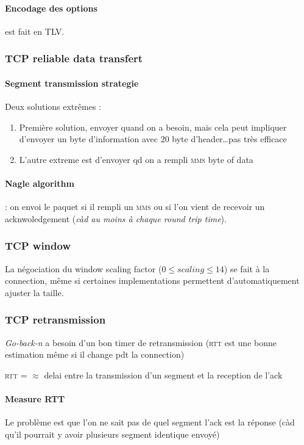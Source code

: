 \paragraph{Encodage des options} est fait en \textsc{TLV}.

\subsubsection{TCP reliable data transfert}

\paragraph{Segment transmission strategie}

Deux solutions extrêmes :
\begin{enumerate}
    \item Première solution, envoyer quand on a besoin, mais cela peut impliquer d'envoyer
        un byte d'information avec 20 byte d'header\ldots pas très efficace
    \item L'autre extreme est d'envoyer qd on a rempli \textsc{mms} byte of data
\end{enumerate}

\paragraph{Nagle  algorithm}  :   on  envoi  le  paquet   si  il  rempli
un  \textsc{mms}  ou  si  l'on  vient  de  recevoir  un  acknwoledgement
(\textit{càd au moins à chaque round trip time}).

\subsubsection{TCP window}

La négociation du  window scaling factor ($0 \leq scaling  \leq 14$) se
fait  à la  connection, même  si certaines  implementations permettent
d'automatiquement ajuster la taille.

\subsubsection{TCP retransmission}
\textit{Go-back-n} a besoin d'un bon timer de retransmission (\textsc{rtt} est une
bonne estimation même si il change pdt la connection)

\textsc{rtt} = $\approx$ delai entre la transmission d'un segment et la reception de l'ack
\paragraph{Measure RTT }
Le problème est que l'on ne sait pas de quel segment l'ack est la réponse (càd qu'il pourrait
y avoir plusieurs segment identique envoyé)

